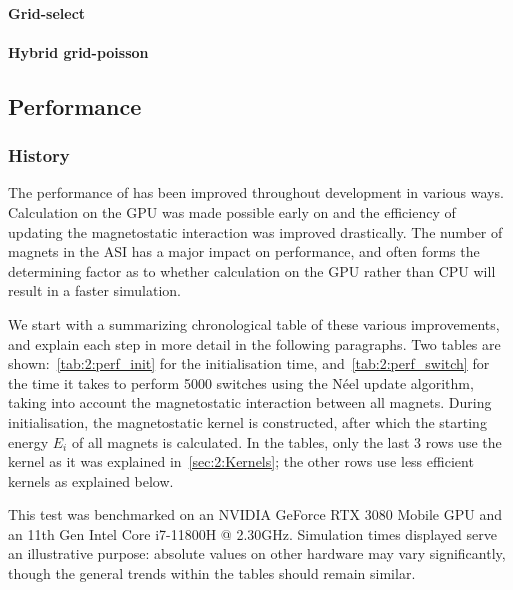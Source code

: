 \paragraph{Grid-select}
\paragraph{Hybrid grid-poisson}

\subsection{Performance} %
\subsubsection{History}
The performance of \hotspice has been improved throughout development in various ways.
Calculation on the GPU was made possible early on and the efficiency of updating the magnetostatic interaction was improved drastically.
The number of magnets in the ASI has a major impact on performance, and often forms the determining factor as to whether calculation on the GPU rather than CPU will result in a faster simulation. \par
We start with a summarizing chronological table of these various improvements, and explain each step in more detail in the following paragraphs.
Two tables are shown:~\cref{tab:2:perf_init} for the initialisation time, and~\cref{tab:2:perf_switch} for the time it takes to perform 5000 switches using the N\'eel update algorithm, taking into account the magnetostatic interaction between all magnets.
During initialisation, the magnetostatic kernel is constructed, after which the starting energy $E_i$ of all magnets is calculated.
In the tables, only the last 3 rows use the kernel as it was explained in~\cref{sec:2:Kernels}; the other rows use less efficient kernels as explained below. \par %
This test was benchmarked on an NVIDIA GeForce RTX 3080 Mobile GPU and an 11th Gen Intel\textregistered{} Core\texttrademark{} i7-11800H @ 2.30GHz.
Simulation times displayed serve an illustrative purpose: absolute values on other hardware may vary significantly, though the general trends within the tables should remain similar.

